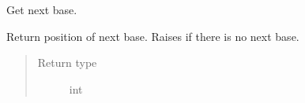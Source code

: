 \documentclass[letterpaper,10pt,english]{sphinxmanual}
\begin{document}
\begin{fulllineitems}
\begin{quote}
\begin{description}
\begin{itemize}
\end{itemize}

\end{description}\end{quote}

\begin{fulllineitems}
\label{cf:libPoMo.cf.CFStream.read_next_pos}
Get next base.

Return position of next base.  Raises  if there is
no next base.
\begin{quote}\begin{description}
\item[{Return type}] \leavevmode
int

\end{description}\end{quote}

\end{fulllineitems}


\end{fulllineitems}

\end{document}
